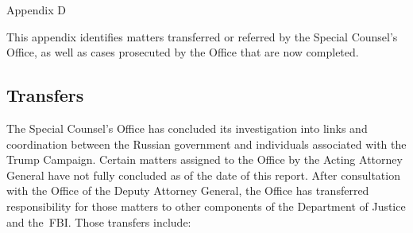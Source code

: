 
\thispagestyle{empty}

\vspace*{15em}

\begin{center}

\Huge
Appendix D

\end{center}

\cleardoublepage

This appendix identifies matters transferred or referred by the Special Counsel's Office, as well as cases prosecuted by the Office that are now completed.

\subsection{Transfers}

The Special Counsel's Office has concluded its investigation into links and coordination between the Russian government and individuals associated with the Trump Campaign.
Certain matters assigned to the Office by the Acting Attorney General have not fully concluded as of the date of this report.
After consultation with the Office of the Deputy Attorney General, the Office has transferred responsibility for those matters to other components of the Department of Justice and the~FBI\null.
Those transfers include:


